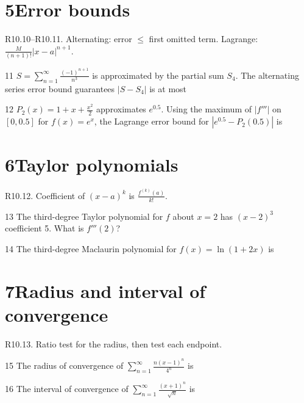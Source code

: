 \documentclass{apcalc}
\begin{document}
\section*{5\quad Error bounds}
\begin{setrule}R10.10–R10.11. Alternating: error $\le$ first omitted term. Lagrange: $\frac{M}{(n+1)!}|x-a|^{n+1}$.\end{setrule}
\begin{q}{11}
$S=\displaystyle\sum_{n=1}^\infty\frac{(-1)^{n+1}}{n^3}$ is approximated by the partial sum $S_4$. The alternating series error bound guarantees $|S-S_4|$ is at most
\end{q}
\begin{q}{12}
$P_2(x)=1+x+\frac{x^2}{2}$ approximates $e^{0.5}$. Using the maximum of $|f'''|$ on $[0,0.5]$ for $f(x)=e^x$, the Lagrange error bound for $|e^{0.5}-P_2(0.5)|$ is
\end{q}
\section*{6\quad Taylor polynomials}
\begin{setrule}R10.12. Coefficient of $(x-a)^k$ is $\frac{f^{(k)}(a)}{k!}$.\end{setrule}
\begin{q}{13}
The third-degree Taylor polynomial for $f$ about $x=2$ has $(x-2)^3$ coefficient 5. What is $f'''(2)$?
\end{q}
\begin{q}{14}
The third-degree Maclaurin polynomial for $f(x)=\ln(1+2x)$ is
\end{q}
\section*{7\quad Radius and interval of convergence}
\begin{setrule}R10.13. Ratio test for the radius, then test each endpoint.\end{setrule}
\begin{q}{15}
The radius of convergence of $\displaystyle\sum_{n=1}^\infty\frac{n(x-1)^n}{4^n}$ is
\end{q}
\begin{q}{16}
The interval of convergence of $\displaystyle\sum_{n=1}^\infty\frac{(x+1)^n}{\sqrt n}$ is
\chfour{$(-2,0]$}{$[-2,0)$}{$[-2,0]$}{$(-2,0)$}
\end{q}
\end{document}
